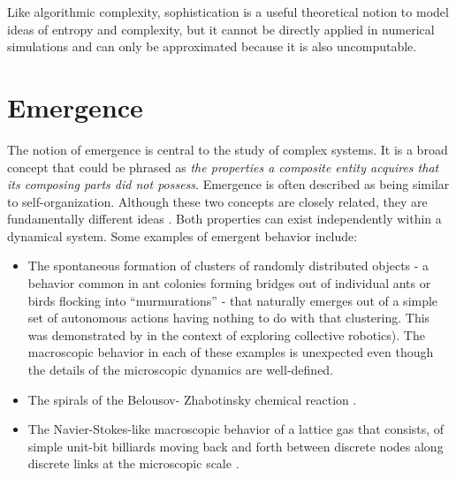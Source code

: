 Like algorithmic complexity, sophistication is a useful theoretical notion to
model ideas of entropy and complexity, but it cannot be directly applied in
numerical simulations and can only be approximated because it is also
uncomputable.



\section{Emergence}\label{sec:emergence}
The notion of emergence is central to the study of complex systems. It is a 
broad concept that could be phrased as \emph{the properties a composite entity
  acquires that its composing parts did not possess}. Emergence is often
described as being similar to self-organization. Although these two concepts are
closely related, they are fundamentally different ideas
\parencite{dewolfEmergenceSelfOrganisationDifferent2005}. Both properties can
exist independently within a dynamical system. Some examples of emergent
behavior include:

\begin{itemize}
  \item The spontaneous formation of clusters of randomly distributed objects -
        a behavior common in ant colonies forming bridges out of individual
        ants or birds flocking into ``murmurations'' - that naturally emerges
        out of a simple set of autonomous actions having nothing to do with that
        clustering. This was demonstrated by
        \textcite{beckersFomLocalActions2000} in the context of exploring
        collective robotics). The macroscopic behavior in each of these examples
        is unexpected even though the details of the microscopic dynamics are
        well-defined.
  \item The spirals of the Belousov- Zhabotinsky chemical reaction
        \parencite{tysonBelousovZhabotinskiiReaction2013}.
  \item The Navier-Stokes-like macroscopic behavior of a lattice gas that
        consists, of simple unit-bit billiards moving back and forth between
        discrete nodes along discrete links at the microscopic scale
        \parencite{hasslacherDiscreteFluids1987}.
\end{itemize}

